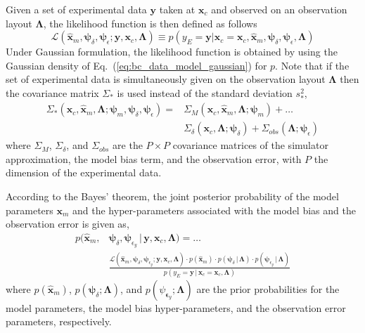 Given a set of experimental data $\mathbf{y}$ taken at $\mathbf{x}_c$ and observed on an observation layout $\bm{\Lambda}$,
the likelihood function is then defined as follows
\begin{equation}
  \mathcal{L}(\hat{\bm{x}}_m, \bm{\psi}_\delta, \bm{\psi}_\epsilon; \mathbf{y}, \mathbf{x}_c, \bm{\Lambda}) \equiv p(y_E = \mathbf{y} | \bm{x}_c = \mathbf{x}_c, \hat{\bm{x}}_m, \bm{\psi}_\delta, \bm{\psi}_{\epsilon}, \bm{\Lambda})
\label{eq:bc_likelihood}
\end{equation}
Under Gaussian formulation, the likelihood function is obtained by using the Gaussian density of Eq.~(\ref{eq:bc_data_model_gaussian}) for $p$.
Note that if the set of experimental data is simultaneously given on the observation layout $\bm{\Lambda}$ then the covariance matrix $\Sigma_*$ is used instead of the standard deviation $s^2_*$,
\begin{equation}
	\begin{split}
	\Sigma_*(\bm{x}_c, \hat{\bm{x}}_m, \bm{\Lambda}; \bm{\psi}_m, \bm{\psi}_\delta, \bm{\psi}_\epsilon) = & \Sigma_M(\bm{x}_c, \hat{\bm{x}}_m, \bm{\Lambda}; \bm{\psi}_{m}) + \ldots \\ 
	& \Sigma_\delta(\bm{x}_c, \bm{\Lambda}; \bm{\psi}_\delta) + \Sigma_{obs}(\bm{\Lambda}; \bm{\psi}_\epsilon)
	\end{split}
\label{eq:bc_gaussian_covariance_matrix}
\end{equation}
where $\Sigma_M$, $\Sigma_\delta$, and $\Sigma_{obs}$ are the $P \times P$ covariance matrices of the simulator approximation, the model bias term, and the observation error, with $P$ the dimension of the experimental data.

According to the Bayes' theorem, the joint posterior probability of the model parameters $\bm{x}_m$ and
the hyper-parameters associated with the model bias and the observation error is given as, 
\begin{equation}
	\begin{split}
  p(\hat{\bm{x}}_m, & \bm{\psi}_\delta, \bm{\psi}_{\epsilon_y}\,|\,\mathbf{y}, \mathbf{x}_c, \bm{\Lambda}) = \ldots \\
	& \frac{\mathcal{L}(\hat{\bm{x}}_m, \bm{\psi}_\delta, \bm{\psi}_{\epsilon_y} ; \mathbf{y}, \mathbf{x}_c, \bm{\Lambda}) \cdot p(\hat{\bm{x}}_m) \cdot p(\bm{\psi}_{\delta}\,|\,\bm{\Lambda}) \cdot p(\bm{\psi}_{\epsilon_y}\,|\,\bm{\Lambda})}{p(y_E = \mathbf{y}\,|\,\bm{x}_c = \mathbf{x}_c , \bm{\Lambda})}
	\end{split}
\label{eq:bc_joint_posterior}
\end{equation}
where $p(\hat{\bm{x}}_m)$, $p(\bm{\psi}_{\delta}; \bm{\Lambda})$, and $p(\psi_{\bm{\epsilon}_y}; \bm{\Lambda})$ are the prior probabilities for the model parameters, the model bias hyper-parameters, and the observation error parameters, respectively.

